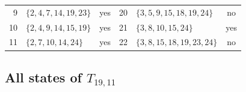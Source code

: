 \documentclass[aps,pra,reprint,superscriptaddress,longbibliography,nofootinbib,floatfix,10pt]{revtex4-2}
\theoremstyle{definition}
\begin{document}
\begin{longtable}{rlc@{\qquad}rlc}
9 & $\{2,\allowbreak 4,\allowbreak 7,\allowbreak 14,\allowbreak 19,\allowbreak 23\}$ & yes & 20 & $\{3,\allowbreak 5,\allowbreak 9,\allowbreak 15,\allowbreak 18,\allowbreak 19,\allowbreak 24\}$ & no\\
10 & $\{2,\allowbreak 4,\allowbreak 9,\allowbreak 14,\allowbreak 15,\allowbreak 19\}$ & yes & 21 & $\{3,\allowbreak 8,\allowbreak 10,\allowbreak 15,\allowbreak 24\}$ & yes\\
11 & $\{2,\allowbreak 7,\allowbreak 10,\allowbreak 14,\allowbreak 24\}$ & yes & 22 & $\{3,\allowbreak 8,\allowbreak 15,\allowbreak 18,\allowbreak 19,\allowbreak 23,\allowbreak 24\}$ & no\\
\end{longtable}\endgroup
{}\subsection{All states of \texorpdfstring{$T_{19,11}$}{gadget 3e}}
\begingroup\footnotesize\setlength{\tabcolsep}{3pt}\setlength{\LTpre}{5pt}\setlength{\LTpost}{8pt}
\end{document}
